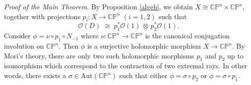 \documentclass[a4paper, 12pt]{article}
\newcommand{\oX}{X}
\newcommand{\bCP}{\mathbb{CP}^n}
\newcommand{\tCP}{\mathbb{CP}^n\times\mathbb{CP}^n}
\newcommand{\cO}{\mathcal{O}}
\begin{document}

\noindent\textit{Proof of the Main Theorem.}
By Proposition \ref{algeb}, 
we obtain \(\oX \cong \tCP\), together with projections \(p_i:\oX \to \bCP\) \((i=1,2)\) such that 
\[
\cO(D) \;\cong\; p_1^*\cO(1)\,\otimes\,p_2^*\cO(1).
\]
Consider $\phi=\nu\circ p_1\circ N_{-1}$ where $\nu: \bCP\rightarrow \bCP$ is the canonical conjugation involution on $\bCP$. Then $\phi$ is a surjective holomorphic morphism $\oX\rightarrow \bCP$. By Mori's theory, there are only two such holomorphic morphisms $p_1$ and $p_2$ up to isomorphism which correspond to the contraction of two extremal rays. In other words, there exists a $\sigma \in \mathrm{Aut}(\bCP)$ such that either $\phi=\sigma\circ p_2$ or $\phi=\sigma\circ p_1$. 
\end{document}
